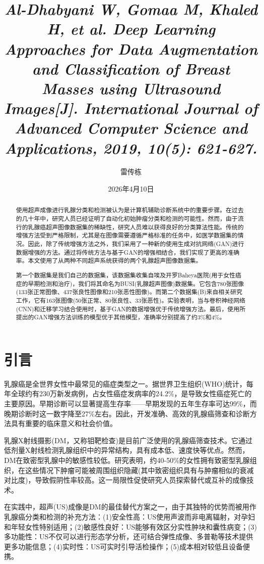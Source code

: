\documentclass[supercite]{../Hust-undergraduate-translation/Experimental_Report}
\title{\textit{Al-Dhabyani W, Gomaa M, Khaled H, et al. Deep Learning Approaches for Data Augmentation and Classification of Breast Masses using Ultrasound Images[J]. International Journal of Advanced Computer Science and Applications, 2019, 10(5): 621-627.}}
\author{雷传栋}
\date{2026年4月10日}
\theoremstyle{definition}
\begin{document}
\maketitle
\clearpage



\begin{abstract}
使用超声成像进行乳腺分类和检测被认为是计算机辅助诊断系统中的重要步骤。在过去的几十年中，研究人员已经证明了自动化初始肿瘤分类和检测的可能性。然而，由于流行的乳腺癌超声图像数据集的稀缺性，研究人员难以获得良好的分类算法性能。传统的增强方法受到严格限制，尤其是在图像需要遵循严格标准的任务中，如医学数据集的情况。因此，除了传统增强方法之外，我们采用了一种新的使用生成对抗网络(GAN)进行数据增强的方法。通过将传统方法与基于GAN的增强相结合，我们实现了更高的准确率。本文使用了从两种不同超声系统获得的两个乳腺超声图像数据集。

第一个数据集是我们自己的数据集，该数据集收集自埃及开罗Baheya医院(用于女性癌症的早期检测和治疗)，我们将其命名为BUSI(乳腺超声图像)数据集。它包含780张图像(133张正常图像、437张良性图像和210张恶性图像)。而第二个数据集(B)来自相关研究工作，它有163张图像(50张正常、80张良性、33张恶性)。实验表明，当与卷积神经网络(CNN)和迁移学习结合使用时，基于GAN的数据增强优于传统增强方法。最后，使用所提出的GAN增强方法训练的模型优于其他模型，准确率分别提高了约3\%和4\%。
\end{abstract}

\section{引言}

乳腺癌是全世界女性中最常见的癌症类型之一。据世界卫生组织(WHO)统计，每年全球约有230万新发病例，占女性癌症发病率的24.2\%，是导致女性癌症死亡的主要原因。早期诊断可以显著提高生存率——早期发现的五年生存率可达99\%，而晚期诊断时这一数字降至27\%左右。因此，开发准确、高效的乳腺癌筛查和诊断方法具有重要的临床意义和社会价值。

乳腺X射线摄影(DM，又称钼靶检查)是目前广泛使用的乳腺癌筛查技术。它通过低剂量X射线检测乳腺组织中的异常结构，具有成本低、速度快等优点。然而，DM在致密型乳腺中的敏感性较低。研究表明，约40-50\%的女性拥有致密型乳腺组织，在这些情况下肿瘤可能被周围组织隐藏(其中致密组织具有与肿瘤相似的衰减对比度)，导致假阴性率较高。这一局限性促使研究人员探索替代或互补的成像技术。

在实践中，超声(US)成像是DM的最佳替代方案之一，由于其独特的优势而被用作乳腺癌分类和检测的补充方法：(1)安全性高：US使用声波而非电离辐射，对孕妇和年轻女性特别适用；(2)敏感性良好：US能够有效区分实性肿块和囊性病变；(3)多功能性：US不仅可以进行形态学分析，还可结合弹性成像、多普勒等技术提供更多功能信息；(4)实时性：US可实时引导活检操作；(5)成本相对较低且设备便携。
\end{document}
